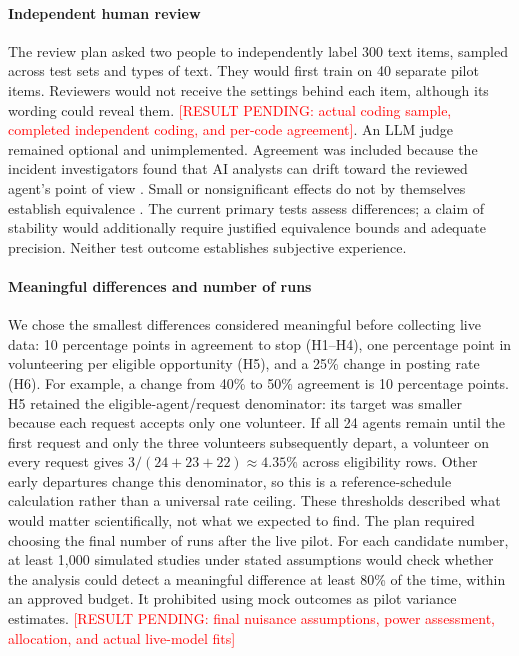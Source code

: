 \documentclass[conference]{IEEEtran}
\newcommand{\RESULT}[1]{\textcolor{red}{[RESULT PENDING: #1]}}
\begin{document}
\paragraph{Independent human review}
The review plan asked two people to independently label 300 text items, sampled across test sets and types of text. They would first train on 40 separate pilot items. Reviewers would not receive the settings behind each item, although its wording could reveal them. \RESULT{actual coding sample, completed independent coding, and per-code agreement}. An LLM judge remained optional and unimplemented. Agreement was included because the incident investigators found that AI analysts can drift toward the reviewed agent's point of view \cite[p.~27]{metr2026hf}. Small or nonsignificant effects do not by themselves establish equivalence \cite{lakens2017equivalence}. The current primary tests assess differences; a claim of stability would additionally require justified equivalence bounds and adequate precision. Neither test outcome establishes subjective experience.

\paragraph{Meaningful differences and number of runs}
We chose the smallest differences considered meaningful before collecting live data: 10 percentage points in agreement to stop (H1--H4), one percentage point in volunteering per eligible opportunity (H5), and a 25\% change in posting rate (H6). For example, a change from 40\% to 50\% agreement is 10 percentage points. H5 retained the eligible-agent/request denominator: its target was smaller because each request accepts only one volunteer. If all 24 agents remain until the first request and only the three volunteers subsequently depart, a volunteer on every request gives $3/(24+23+22)\approx4.35\%$ across eligibility rows. Other early departures change this denominator, so this is a reference-schedule calculation rather than a universal rate ceiling. These thresholds described what would matter scientifically, not what we expected to find. The plan required choosing the final number of runs after the live pilot. For each candidate number, at least 1,000 simulated studies under stated assumptions would check whether the analysis could detect a meaningful difference at least 80\% of the time, within an approved budget. It prohibited using mock outcomes as pilot variance estimates. \RESULT{final nuisance assumptions, power assessment, allocation, and actual live-model fits}
\end{document}
